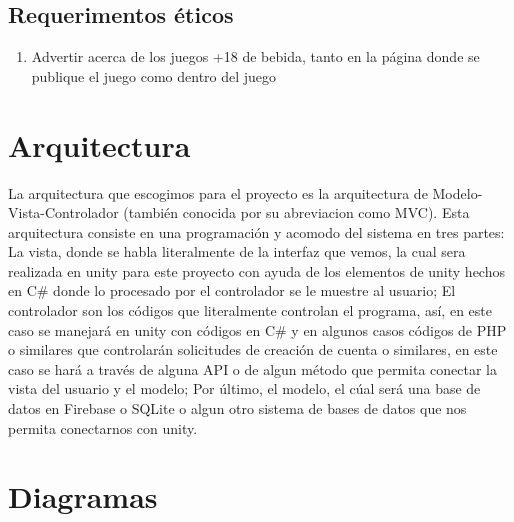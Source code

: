 \documentclass[12pt, oneside, letterpaper]{book}
\begin{document}
\section{Requerimentos éticos }
\begin{enumerate}
\item Advertir acerca de los juegos +18 de bebida, tanto en la página donde se publique el juego como dentro del juego
\end{enumerate}

\newpage 
\chapter{Arquitectura}  

\p La arquitectura que escogimos para el proyecto es la arquitectura de Modelo-Vista-Controlador (también conocida por su abreviacion como MVC). Esta arquitectura consiste en una programación y acomodo del sistema en tres partes: La vista, donde se habla literalmente de la interfaz que vemos, la cual sera realizada en unity para este proyecto con ayuda de los elementos de unity hechos en C# donde lo procesado por el controlador se le muestre al usuario; El controlador son los códigos que literalmente controlan el programa, así, en este caso se manejará en unity con códigos en C# y en algunos casos códigos de PHP o similares que controlarán solicitudes de creación de cuenta o similares, en este caso se hará a través de alguna API o de algun método que permita conectar la vista del usuario y el modelo; Por último, el modelo, el cúal será una base de datos en Firebase o SQLite o algun otro sistema de bases de datos que nos permita conectarnos con unity.

\chapter{Diagramas}
\newpage
\end{document}
